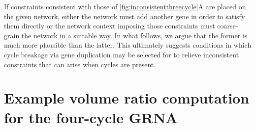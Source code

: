 If constraints consistent with those of \ref{fig:inconsistentthreecycle}A are placed on the given network, either the network must add another gene in order to satisfy them directly or the network context imposing those constraints must coarse-grain the network in a suitable way. In what follows, we argue that the former is much more plausible than the latter. This ultimately suggests conditions in which cycle breakage via gene duplication may be selected for to relieve inconsistent constraints that can arise when cycles are present.


\section{Example volume ratio computation for the four-cycle GRNA}\label{secsupp:fourcycleexample}

